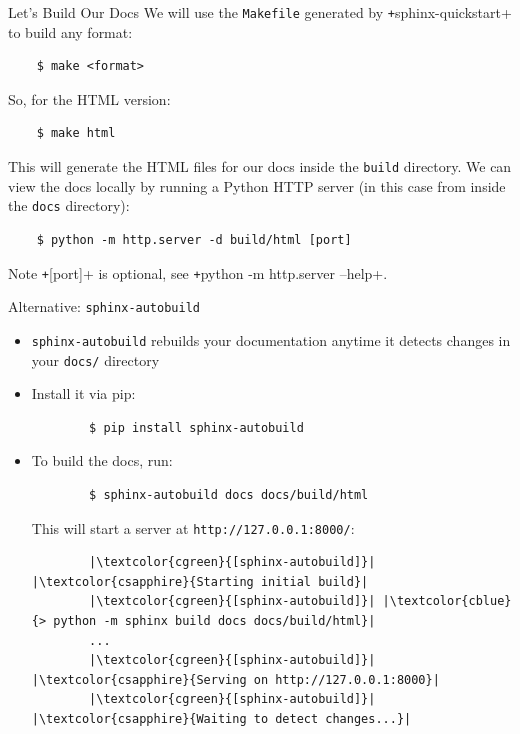 \begin{frame}[fragile]{Let's Build Our Docs}
  We will use the \texttt{Makefile} generated by \texttt+sphinx-quickstart+ to build any format:
  \begin{verbatim}
    $ make <format>
  \end{verbatim}
  So, for the HTML version:
  \begin{verbatim}
    $ make html
  \end{verbatim}
  This will generate the HTML files for our docs inside the \texttt{build} directory.
  We can view the docs locally by running a Python HTTP server (in this case from inside the \texttt{docs} directory):
  \begin{verbatim}
    $ python -m http.server -d build/html [port]
  \end{verbatim}

  \begin{block}{Note}
    \texttt+[port]+ is optional, see \texttt+python -m http.server --help+.
  \end{block}
\end{frame}

\begin{frame}[fragile]{
    Alternative: \texttt{sphinx-autobuild}
    \hfill
  }
  \begin{itemize}
    \item \texttt{sphinx-autobuild} rebuilds your documentation anytime it detects changes in your \texttt{docs/} directory
    \item Install it via pip:
      \begin{verbatim}
        $ pip install sphinx-autobuild
      \end{verbatim}
    \item To build the docs, run:
      \begin{verbatim}
        $ sphinx-autobuild docs docs/build/html
      \end{verbatim}
      This will start a server at \texttt{http://127.0.0.1:8000/}:
      \begin{verbatim}
        |\textcolor{cgreen}{[sphinx-autobuild]}| |\textcolor{csapphire}{Starting initial build}|
        |\textcolor{cgreen}{[sphinx-autobuild]}| |\textcolor{cblue}{> python -m sphinx build docs docs/build/html}|
        ...
        |\textcolor{cgreen}{[sphinx-autobuild]}| |\textcolor{csapphire}{Serving on http://127.0.0.1:8000}|
        |\textcolor{cgreen}{[sphinx-autobuild]}| |\textcolor{csapphire}{Waiting to detect changes...}|
      \end{verbatim}
  \end{itemize}
\end{frame}


